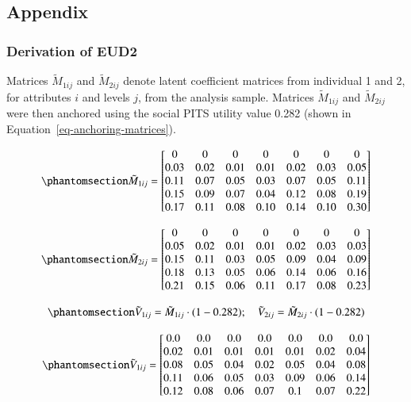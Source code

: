 \documentclass[
  number,
  preprint]{elsarticle}
\begin{document}
\subsection{Appendix}\label{appendix}

\subsubsection{Derivation of EUD2}\label{sec-appendix1}

Matrices \(\tilde{M}_{1ij}\) and \(\tilde{M}_{2ij}\) denote latent
coefficient matrices from individual 1 and 2, for attributes \(i\) and
levels \(j\), from the analysis sample. Matrices \(\tilde{M}_{1ij}\) and
\(\tilde{M}_{2ij}\) were then anchored using the social PITS utility
value 0.282 (shown in Equation~\ref{eq-anchoring-matrices}).

\begin{equation}\phantomsection\label{eq-coef-1}{
\tilde{M}_{1ij} =  
\begin{bmatrix}
0 & 0 & 0 & 0 & 0 & 0 & 0 \\
0.03 & 0.02 & 0.01 & 0.01 & 0.02 & 0.03 & 0.05 \\
0.11 & 0.07 & 0.05 & 0.03 & 0.07 & 0.05 & 0.11 \\
0.15 & 0.09 & 0.07 & 0.04 & 0.12 & 0.08 & 0.19 \\
0.17 & 0.11 & 0.08 & 0.10 & 0.14 & 0.10 & 0.30
\end{bmatrix}
}\end{equation}

\begin{equation}\phantomsection\label{eq-coef-2}{
\tilde{M}_{2ij} =  
\begin{bmatrix}
0 & 0 & 0 & 0 & 0 & 0 & 0 \\
0.05 & 0.02 & 0.01 & 0.01 & 0.02 & 0.03 & 0.03 \\
0.15 & 0.11 & 0.03 & 0.05 & 0.09 & 0.04 & 0.09 \\
0.18 & 0.13 & 0.05 & 0.06 & 0.14 & 0.06 & 0.16 \\
0.21 & 0.15 & 0.06 & 0.11 & 0.17 & 0.08 & 0.23
\end{bmatrix}
}\end{equation}

\begin{equation}\phantomsection\label{eq-anchoring-matrices}{
    \tilde{V}_{1ij} = \tilde{M}_{1ij} \cdot (1-0.282); \quad
    \tilde{V}_{2ij} = \tilde{M}_{2ij} \cdot (1-0.282)
}\end{equation}

\begin{equation}\phantomsection\label{eq-vcoeff}{
\tilde{V}_{1ij} =  
\begin{bmatrix}
0.0 & 0.0 & 0.0 & 0.0 & 0.0 & 0.0 & 0.0 \\
0.02 & 0.01 & 0.01 & 0.01 & 0.01 & 0.02 & 0.04 \\
0.08 & 0.05 & 0.04 & 0.02 & 0.05 & 0.04 & 0.08 \\
0.11 & 0.06 & 0.05 & 0.03 & 0.09 & 0.06 & 0.14 \\
0.12 & 0.08 & 0.06 & 0.07 & 0.1 & 0.07 & 0.22
\end{bmatrix}
}\end{equation}
\end{document}
